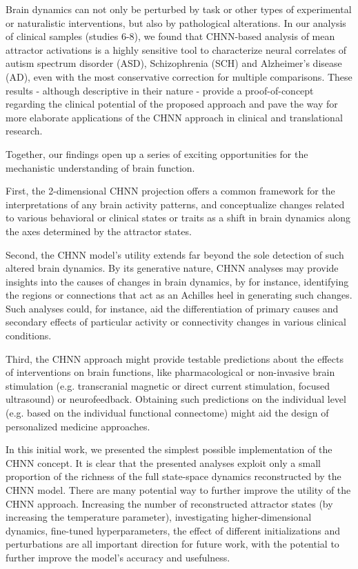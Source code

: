 \documentclass{article}
\begin{document}
Brain dynamics can not only be perturbed by task or other types of experimental or naturalistic interventions, but also
by pathological alterations. In our analysis of clinical samples (studies 6-8), we found that CHNN-based analysis of mean attractor activations is a highly sensitive tool to characterize neural correlates of autism spectrum disorder (ASD), Schizophrenia (SCH) and Alzheimer's disease (AD), even with the most conservative correction for multiple comparisons. These results - although descriptive in their nature - provide a proof-of-concept regarding the clinical potential of the proposed approach and pave the way for more elaborate applications of the CHNN approach in clinical and translational research.

Together, our findings open up a series of exciting opportunities for the mechanistic understanding of brain function.

First, the 2-dimensional CHNN projection offers a common framework for the interpretations of any brain activity patterns, and conceptualize changes related to various behavioral or clinical states or traits as a shift in brain dynamics along the axes determined by the attractor states.

Second, the CHNN model's utility extends far beyond the sole detection of such altered brain dynamics. By its generative nature, CHNN analyses may provide insights into the causes of changes in brain dynamics, by for instance, identifying the regions or connections that act as an Achilles heel in generating such changes. Such analyses could, for instance, aid the differentiation of primary causes and secondary effects of particular activity or connectivity changes in various clinical conditions.

Third, the CHNN approach might provide testable predictions about the effects of interventions on brain functions,
like pharmacological or non-invasive brain stimulation (e.g. transcranial magnetic or direct current stimulation,
focused ultrasound) or neurofeedback. Obtaining such predictions on the individual level (e.g. based on the individual functional connectome) might aid the design of personalized medicine approaches.

In this initial work, we presented the simplest possible implementation of the CHNN concept. It is clear that the presented analyses   exploit only a small proportion of the richness of the full state-space dynamics reconstructed by the CHNN model.
There are many potential way to further improve the utility of the CHNN approach. Increasing the number of reconstructed attractor states (by increasing the temperature parameter), investigating higher-dimensional dynamics, fine-tuned hyperparameters, the effect of
different initializations and perturbations are all important direction for future work, with the potential to further
improve the model's accuracy and usefulness.
\end{document}
